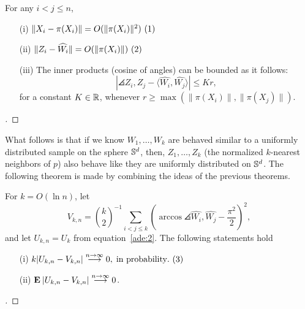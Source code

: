 \begin{theorem}\label{ade:T3}
  For any $i<j \leq n$,
  \begin{enumerate}
    \item[(i)]    \( \|X_i-\pi(X_i)\|  =   O(\|\pi (X_i)\|^2) \hfill\inlinetag  \)
    \item[(ii)]   \( \|Z_i-\widehat{W_i}\|  =   O(\|\pi (X_i) \|) \hfill\inlinetag \)
    \item[(iii)]  The inner products (cosine of angles) can be bounded as it follows:
    \begin{equation}\label{ade:7}
      |\angles{Z_i,Z_j} - \langle\widehat{W_i}, \widehat{W_j}\rangle| \leq K r,
    \end{equation}
    for a constant $K\in\R$, whenever $r \geq \max (\|\pi(X_i)\|,\|\pi(X_j)\|)$.
  \end{enumerate}
\end{theorem}
\begin{proof}[]

\end{proof}

\vspace*{0.5 em}

What follows is that if we know $W_1,\ldots, W_k$ are behaved similar to a uniformly distributed sample on the sphere $\S^d$, then, $Z_1,\ldots, Z_k$ (the normalized $k$-nearest neighbors of $p$) also behave like they are uniformly distributed on $\S^d$. The following theorem is made by combining the ideas of the previous theorems.

\begin{theorem}\label{ade:T4}
  For $k = O(\ln n)$, let
  \begin{equation}\label{ade:8}
    V_{k,n} = \binom{k}{2}^{-1} \sum_{i<j\leq k}{\left(
      \arccos\angles{\widehat{W_i}, \widehat{W_j}} - \frac{\pi^2}{2} 
      \right)}^{2},
  \end{equation}
  and let $U_{k,n} = U_k$ from equation~\ref{ade:2}. The following statements hold
  \begin{enumerate}
    \item[(i)]    \( k |U_{k,n} - V_{k,n}| \overset{n\to\infty}{\longrightarrow} 0,\;\mbox{in probability}. \hfill\inlinetag  \)
    \item[(ii)]    \( \E |U_{k,n} - V_{k,n}| \overset{n\to\infty}{\longrightarrow} 0\).
  \end{enumerate}
\end{theorem}
\begin{proof}[]

\end{proof}

